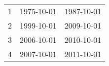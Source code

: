% 
\begin{tabular}{ccc}
  \hline
  \hline
1 & 1975-10-01 & 1987-10-01 \\ 
  2 & 1999-10-01 & 2009-10-01 \\ 
  3 & 2006-10-01 & 2010-10-01 \\ 
  4 & 2007-10-01 & 2011-10-01 \\ 
   \hline
\end{tabular}
